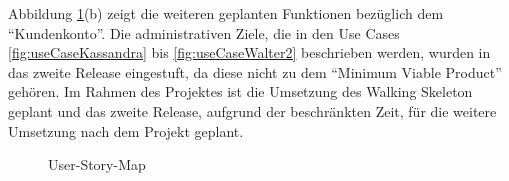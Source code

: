 	 Abbildung \ref{fig:userStoryMap}(b) zeigt die weiteren geplanten Funktionen bezüglich dem \enquote{Kundenkonto}. Die administrativen Ziele, die in den Use Cases \ref{fig:useCaseKassandra} bis \ref{fig:useCaseWalter2} beschrieben werden, wurden in das zweite Release eingestuft, da diese nicht zu dem \enquote{Minimum Viable Product} gehören. Im Rahmen des Projektes ist die Umsetzung des Walking Skeleton geplant und das zweite Release, aufgrund der beschränkten Zeit, für die weitere Umsetzung nach dem Projekt geplant.

	\begin{figure}[H]
		\caption[User-Story-Map ]{\label{fig:userStoryMap}User-Story-Map\footnotemark}
	\end{figure} 
